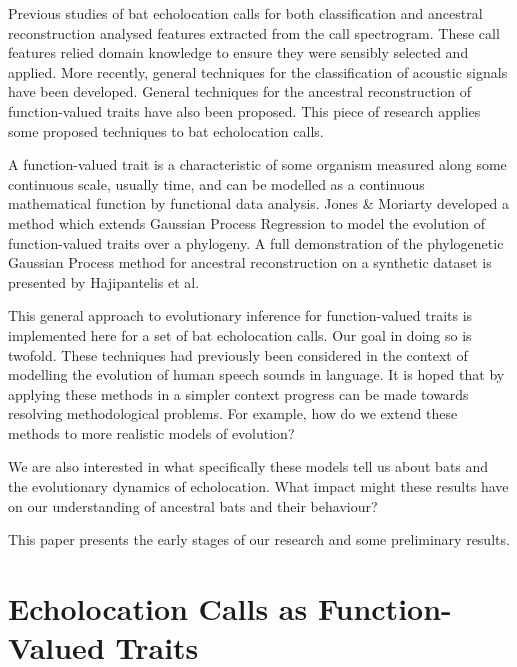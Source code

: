 \documentclass[wsdraft]{ws-rv9x6} %
\begin{document}
Previous studies of bat echolocation calls for both classification \cite{walters2012continental} and ancestral reconstruction \cite{collen2012evolution} analysed features extracted from the call spectrogram. These call features relied domain knowledge to ensure they were sensibly selected and applied. More recently, general techniques for the classification of acoustic signals have been developed. \cite{stathopoulos2014bat} \cite{damoulas2010bayesian} General techniques for the ancestral reconstruction of function-valued traits have also been proposed. \cite{group2012phylogenetic} This piece of research applies some proposed techniques to bat echolocation calls.

A function-valued trait\cite{meyer2005up} is a characteristic of some organism measured along some continuous scale, usually time, and can be modelled as a continuous mathematical function by functional data analysis. \cite{ramsay2006functional} Jones \& Moriarty \cite{jones2013evolutionary} developed a method which extends Gaussian Process Regression \cite{rasmussen2006gaussian} to model the evolution of function-valued traits over a phylogeny. A full demonstration of the phylogenetic Gaussian Process method for ancestral reconstruction on a synthetic dataset is presented by Hajipantelis et al.\cite{hadjipantelis2013function}

This general approach to evolutionary inference for function-valued traits is implemented here for a set of bat echolocation calls. Our goal in doing so is twofold. These techniques had previously been considered in the context of modelling the evolution of human speech sounds in language. \cite{group2012phylogenetic} It is hoped that by applying these methods in a simpler context progress can be made towards resolving methodological problems. For example, how do we extend these methods to more realistic models of evolution?

We are also interested in what specifically these models tell us about bats and the evolutionary dynamics of echolocation. What impact might these results have on our understanding of ancestral bats and their behaviour?

This paper presents the early stages of our research and some preliminary results.

\section{Echolocation Calls as Function-Valued Traits}
\end{document}

